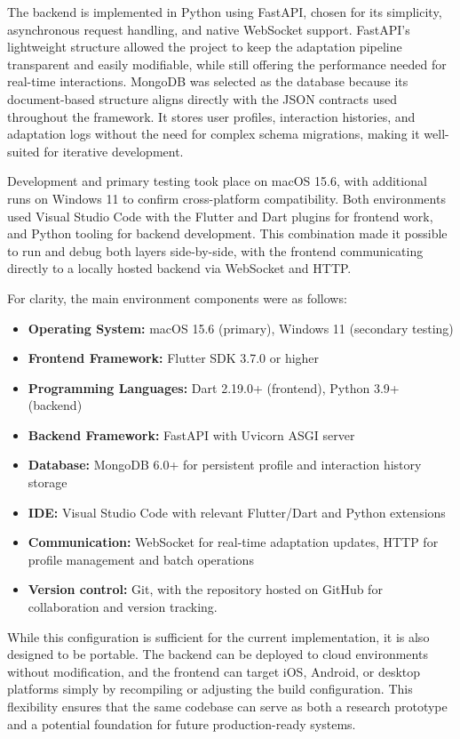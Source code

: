 \documentclass[openany]{book}
\begin{document}
The backend is implemented in Python using FastAPI, chosen for its simplicity, asynchronous request handling, and native WebSocket support. FastAPI’s lightweight structure allowed the project to keep the adaptation pipeline transparent and easily modifiable, while still offering the performance needed for real-time interactions. MongoDB was selected as the database because its document-based structure aligns directly with the JSON contracts used throughout the framework. It stores user profiles, interaction histories, and adaptation logs without the need for complex schema migrations, making it well-suited for iterative development.

Development and primary testing took place on macOS 15.6, with additional runs on Windows 11 to confirm cross-platform compatibility. Both environments used Visual Studio Code with the Flutter and Dart plugins for frontend work, and Python tooling for backend development. This combination made it possible to run and debug both layers side-by-side, with the frontend communicating directly to a locally hosted backend via WebSocket and HTTP.

For clarity, the main environment components were as follows:
\begin{itemize}
    \item \textbf{Operating System:} macOS 15.6 (primary), Windows 11 (secondary testing)
    \item \textbf{Frontend Framework:} Flutter SDK 3.7.0 or higher
    \item \textbf{Programming Languages:} Dart 2.19.0+ (frontend), Python 3.9+ (backend)
    \item \textbf{Backend Framework:} FastAPI with Uvicorn ASGI server
    \item \textbf{Database:} MongoDB 6.0+ for persistent profile and interaction history storage
    \item \textbf{IDE:} Visual Studio Code with relevant Flutter/Dart and Python extensions
    \item \textbf{Communication:} WebSocket for real-time adaptation updates, HTTP for profile management and batch operations
    \item \textbf{Version control:} Git, with the repository hosted on GitHub for collaboration and version tracking.
\end{itemize}

While this configuration is sufficient for the current implementation, it is also designed to be portable. The backend can be deployed to cloud environments without modification, and the frontend can target iOS, Android, or desktop platforms simply by recompiling or adjusting the build configuration. This flexibility ensures that the same codebase can serve as both a research prototype and a potential foundation for future production-ready systems.
\end{document}

